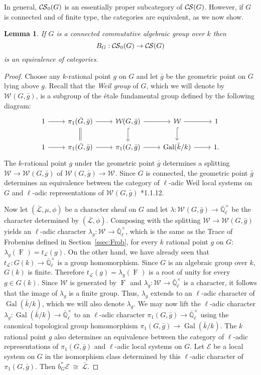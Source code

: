 \documentclass[10pt]{amsart}
\theoremstyle{plain}
\newtheorem{lemma}[theorem]{Lemma}
\theoremstyle{definition}
\theoremstyle{remark}
\newcommand{\EE}{\mathbb{\bar Q}_\ell}
\newcommand{\bFq}{\bar{k}}
\newcommand{\Fq}{k}
\newcommand{\EEx}{\EE^\times}
\newcommand{\Weil}[1]{\mathcal{W}_{#1}}
\DeclareMathOperator{\Gal}{Gal}
\newcommand{\Frob}[1]{\operatorname{F}_{#1}}
\newcommand{\iso}{{\ \cong\ }}
\newcommand{\trFrob}[1]{t_{#1}}
\newcommand{\cs}[1]{{\mathcal{#1}}}
\newcommand{\gcs}[1]{{\mathcal{\bar #1}}}
\newcommand{\CS}{{\mathcal{C\hskip-0.8pt S}}}
\newcommand{\bCS}{{\CS_0}}
\newcommand{\bg}{{\bar{g}}}
\newcommand{\bG}{\bar{G}}
\begin{document}
In general, $\bCS(G)$ is an essentially
proper subcategory of $\CS(G)$. 
However, if $G$ is connected and of finite type, the categories are equivalent, as we now show.

\begin{lemma}\label{lem:bounded_connected}
If $G$ is a connected commutative algebraic group over $\Fq$ then 
\[
B_G : \bCS(G) \to \CS(G)
\]
 is an equivalence of categories.
\end{lemma}

\begin{proof}
Choose any $\Fq$-rational point $g$ on $G$ and let $\bg$ be the geometric point on $G$ lying above $g$.
Recall that the \emph{Weil group} of $G$, which we will denote by $\Weil{}(G,\bg)$, is a subgroup of the \'etale
fundamental group defined by the following diagram:
\[
 \begin{tikzcd}
 1 \rar & \ar[equal]{d} \pi_1(\bG, \bg) \rar & \Weil{}(G,\bg) \rar \dar[hook] & \Weil{} \rar \dar[hook] & 1 \\
 1 \rar &  \pi_1(\bG, \bg) \rar & \pi_1(G,\bg) \rar & \Gal(\bFq/\Fq) \rar & 1.
 \end{tikzcd}
\]
The $\Fq$-rational point $g$ under the geometric point $\bg$ determines a splitting
$\Weil{}\to \Weil{}(G,\bg)$ of $\Weil{}(G,\bg)\to \Weil{}$.
%
  Since $G$ is connected, the geometric point $\bg$ determines
  an equivalence between the category of $\ell$-adic Weil local systems on $G$ and
  $\ell$-adic representations of $\Weil{}(G,\bg)$ \cite{deligne:80a}*{1.1.12}.
  
  Now let $(\gcs{L},\mu,\phi)$ be a character sheaf on $G$
  and let $\lambda : \Weil{}(G, \bg) \to \EEx$ be the character determined by $(\gcs{L},\phi)$.
  Composing with the splitting $\Weil{} \to \Weil{}(G,\bg)$ yields an $\ell$-adic character
  $\lambda_g : \Weil{} \to \EEx$, which is the same as the Trace of Frobenius defined in Section~\ref{ssec:Frob}, for every $\Fq$ rational point $g$ on $G$:
  $
  \lambda_g(\Frob{}) =  \trFrob{\cs{L}}(g).
  $
%
  On the other hand, we have already seen that $\trFrob{\cs{L}} : G(\Fq) \to \EEx$
  is a group homomorphism. 
  Since $G$ is an algebraic group over $\Fq$, $G(\Fq)$ is finite.
  Therefore $\trFrob{\cs{L}}(g) = \lambda_g(\Frob{})$ is a root of unity
  for every $g\in G(\Fq)$.  Since $\Weil{}$ is generated by
  $\Frob{}$ and $\lambda_g : \Weil{} \to \EEx$ is
  a character, it follows that the image of $\lambda_g$ is a finite group.
  Thus, $\lambda_g$ extends to an $\ell$-adic character of $\Gal(\bFq/\Fq)$,
  which we will also denote $\lambda_g$.
%
  We may now lift the $\ell$-adic character $\lambda_g : \Gal(\bFq/\Fq) \to \EEx$
  to an $\ell$-adic character $\pi_1(G,\bg) \to \EEx$ using the canonical topological group homomorphism
  $\pi_1(G,\bg) \to \Gal(\bFq/\Fq)$. 
  The $\Fq$ rational point $g$ also
  determines an equivalence between the category of $\ell$-adic
  representations of $\pi_1(G,\bg)$ and $\ell$-adic local systems on $G$. Let
  $\cs{E}$ be a local system on $G$ in the isomorphism class
  determined by this $\ell$-adic character of $\pi_1(G,\bg)$.
  Then $b_G^*\cs{E} \iso \gcs{L}$.
  

\end{proof}
\end{document}

